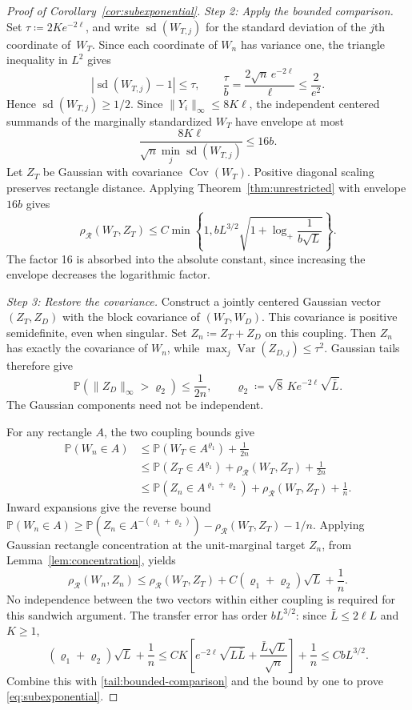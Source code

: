 \documentclass[11pt,letterpaper]{article}
\theoremstyle{remark}
\newcommand{\Pp}{\mathbb P}
\newcommand{\Cov}{\operatorname{Cov}}
\newcommand{\Var}{\operatorname{Var}}
\newcommand{\rh}{\rho_{\mathcal R}}
\begin{document}
\begin{proof}[Proof of Corollary~\ref{cor:subexponential}]
\emph{Step 2: Apply the bounded comparison.}
Set \(\tau\coloneqq 2Ke^{-2\ell}\), and write \(\operatorname{sd}(W_{T,j})\) for the
standard deviation of the \(j\)th coordinate of~\(W_T\).
Since each coordinate of \(W_n\) has variance one, the triangle
inequality in \(L^2\) gives
\[
 |\operatorname{sd}(W_{T,j})-1|\le\tau,
 \qquad \frac\tau b=\frac{2\sqrt n\,e^{-2\ell}}\ell
 \le\frac2{e^2}.
\]
Hence \(\operatorname{sd}(W_{T,j})\ge1/2\). Since \(\|Y_i\|_\infty\le8K\ell\), the
independent centered summands of the marginally standardized \(W_T\)
have envelope at most
\[
 \frac{8K\ell}{\sqrt n\min_j\operatorname{sd}(W_{T,j})}\le16b.
\]
Let \(Z_T\) be Gaussian with covariance \(\Cov(W_T)\).
Positive diagonal scaling preserves rectangle distance. Applying
Theorem~\ref{thm:unrestricted} with envelope \(16b\) gives
\begin{equation}
 \rh(W_T,Z_T)\le C\min\left\{1,
 bL^{3/2}\sqrt{1+\log_+\frac1{b\sqrt L}}\right\}.
 \label{tail:bounded-comparison}
\end{equation}
The factor 16 is absorbed into the absolute constant, since increasing
the envelope decreases the logarithmic factor.

\emph{Step 3: Restore the covariance.}
Construct a jointly centered Gaussian vector \((Z_T,Z_D)\) with the
block covariance of \((W_T,W_D)\). This covariance is positive
semidefinite, even when singular. Set \(Z_n\coloneqq Z_T+Z_D\) on this coupling.
Then \(Z_n\) has exactly the covariance of \(W_n\), while
\(\max_j\Var(Z_{D,j})\le\tau^2\). Gaussian tails therefore give
\begin{equation}
 \Pp(\|Z_D\|_\infty>\varrho_2)\le\frac1{2n},\qquad
 \varrho_2\coloneqq \sqrt8\,Ke^{-2\ell}\sqrt{\bar L}.
 \label{tail:Gaussian-coupling}
\end{equation}
The Gaussian components need not be independent.

For any rectangle \(A\), the two coupling bounds give
\begin{align*}
 \Pp(W_n\in A)
 &\le\Pp(W_T\in A^{\varrho_1})+\frac1{2n}\\
 &\le\Pp(Z_T\in A^{\varrho_1})+\rh(W_T,Z_T)+\frac1{2n}\\
 &\le\Pp(Z_n\in A^{\varrho_1+\varrho_2})+\rh(W_T,Z_T)+\frac1n.
\end{align*}
Inward expansions give the reverse bound
\(\Pp(W_n\in A)\ge\Pp(Z_n\in A^{-(\varrho_1+\varrho_2)})
-\rh(W_T,Z_T)-1/n\). Applying Gaussian rectangle concentration at
the unit-marginal target \(Z_n\), from Lemma~\ref{lem:concentration}, yields
\begin{equation}
 \rh(W_n,Z_n)\le\rh(W_T,Z_T)
       +C(\varrho_1+\varrho_2)\sqrt L+\frac1n.
 \label{tail:transfer}
\end{equation}
No independence between the two vectors within either coupling is
required for this sandwich argument.
The transfer error has order \(bL^{3/2}\): since
\(\bar L\le2\ell L\) and \(K\ge1\),
\[
 (\varrho_1+\varrho_2)\sqrt L+\frac1n
 \le CK\left[e^{-2\ell}\sqrt{L\bar L}
                     +\frac{\bar L\sqrt L}{\sqrt n}\right]+\frac1n
 \le CbL^{3/2}.
\]
Combine this with \eqref{tail:bounded-comparison} and the bound by one
to prove \eqref{eq:subexponential}.


\end{proof}
\end{document}
